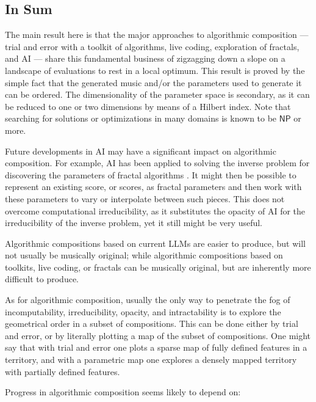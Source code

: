 \documentclass[11pt,papersize=a4]{scrartcl}
\begin{document}
\subsection*{In Sum}

The main result here is that the major approaches to algorithmic composition --- trial and error with a toolkit of algorithms, live coding, exploration of fractals, and AI --- share this fundamental business of zigzagging down a slope on a landscape of evaluations to rest in a local optimum. This result is proved by the simple fact that the generated music and/or the parameters used to generate it can be ordered. The dimensionality of the parameter space is secondary, as it can be reduced to one or two dimensions by means of a Hilbert index. Note that searching for solutions or optimizations in many domains is known to be $\mathsf{NP}$ or more.

Future developments in AI may have a significant impact on algorithmic composition. For example, AI has been applied to solving the inverse problem for discovering the parameters of fractal algorithms \parencite{tu2023learning}. It might then be possible to represent an existing score, or scores, as fractal parameters and then work with these parameters to vary or interpolate between such pieces. This does not overcome computational irreducibility, as it substitutes the opacity of AI for the irreducibility of the inverse problem, yet it still might be very useful.

 Algorithmic compositions based on current LLMs are easier to produce, but will not usually be musically original; while algorithmic compositions based on toolkits, live coding, or fractals can be musically original, but are inherently more difficult to produce.

As for algorithmic composition, usually the only way to penetrate the fog of incomputability, irreducibility, opacity, and intractability is to explore the geometrical order in a subset of compositions. This can be done either by trial and error, or by literally plotting a map of the subset of compositions. One might say that with trial and error one plots a sparse map of fully defined features in a territory, and with a parametric map one explores a densely mapped territory with partially defined features.

Progress in algorithmic composition seems likely to depend on:
\end{document}
